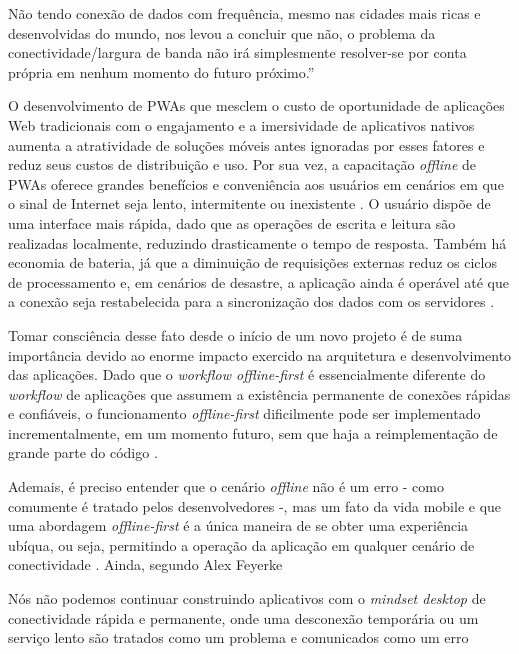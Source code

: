 \documentclass[
	article,			%
	12pt,				%
	oneside,			%
	a4paper,			%
	english,			%
	brazil,				%
	sumario=tradicional
	]{abntex2}
\begin{document}
\begin{citacao}
	Não tendo conexão de dados com frequência, mesmo nas cidades mais ricas e desenvolvidas do mundo, nos levou a concluir que não, o problema da conectividade/largura de banda não irá simplesmente resolver-se por conta própria em nenhum momento do futuro próximo.” \cite[tradução nossa]{feyerke-2013}
\end{citacao}

O desenvolvimento de PWAs que mesclem o custo de oportunidade de aplicações Web tradicionais com o engajamento e a imersividade de aplicativos nativos aumenta a atratividade de soluções móveis antes ignoradas por esses fatores e reduz seus custos de distribuição e uso. Por sua vez, a capacitação \textit{offline} de PWAs oferece grandes benefícios e conveniência aos usuários em cenários em que o sinal de Internet seja lento, intermitente ou inexistente \cite{da-14-2017}. O usuário dispõe de uma interface mais rápida, dado que as operações de escrita e leitura são realizadas localmente, reduzindo drasticamente o tempo de resposta. Também há economia de bateria, já que a diminuição de requisições externas reduz os ciclos de processamento e, em cenários de desastre, a aplicação ainda é operável até que a conexão seja restabelecida para a sincronização dos dados com os servidores \cite{holt-2015}.

Tomar consciência desse fato desde o início de um novo projeto é de suma importância devido ao enorme impacto exercido na arquitetura e desenvolvimento das aplicações. Dado que o \textit{workflow  offline-first} é essencialmente diferente do \textit{workflow} de aplicações que assumem a existência permanente de conexões rápidas e confiáveis, o funcionamento \textit{offline-first} dificilmente pode ser implementado incrementalmente, em um momento futuro, sem que haja a reimplementação de grande parte do código \cite{prasad-2011}.

Ademais, é preciso entender que o cenário \textit{offline} não é um erro - como comumente é tratado pelos desenvolvedores -, mas um fato da vida mobile \cite{feyerke-2014} e que uma abordagem \textit{offline-first} é a única maneira de se obter uma experiência ubíqua, ou seja, permitindo a operação da aplicação em qualquer cenário de conectividade \cite{holt-2015}. Ainda, segundo Alex Feyerke

\begin{citacao}
	Nós não podemos continuar construindo aplicativos com o \textit{mindset desktop} de conectividade rápida e permanente, onde uma desconexão temporária ou um serviço lento são tratados como um problema e comunicados como um erro \cite[tradução nossa]{feyerke-2013}
\end{citacao}
\end{document}
